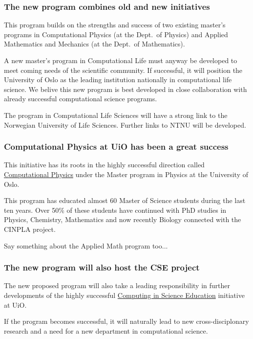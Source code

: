 \documentclass{beamer}
\begin{document}
\begin{frame}
\frametitle{The new program combines old and new initiatives}

\begin{block}{}

This program builds on the strengths and success of two existing master's
programs in Computational Physics (at the Dept.~of Physics) and
Applied Mathematics and Mechanics (at the Dept.~of Mathematics).

A new master's program in Computational Life must anyway be developed to
meet coming needs of the scientific community. If successful, it will
position the University of Oslo as the leading institution
nationally in computational life science. We belive this new program is
best developed in close collaboration with already successful
computational science programs.

The program in Computational Life Sciences will have a strong
link to the Norwegian University of Life Sciences. Further links to
NTNU will be developed.
\end{block}
\end{frame}

\begin{frame}
\frametitle{Computational Physics at UiO has been a great success}

\begin{block}{}

This initiative has its roots in the highly successful direction called \href{{http://www.uio.no/english/studies/programmes/physics-master/programme-options/computational/index.html}}{Computational Physics}
under the Master program in Physics at the University of Oslo.

This program has educated almost 60 Master of Science students during
the last ten years.  Over 50\% of these students have continued with
PhD studies in Physics, Chemistry, Mathematics and now recently
Biology connected with the CINPLA project.

Say something about the Applied Math program too...
\end{block}
\end{frame}

\begin{frame}
\frametitle{The new program will also host the CSE project}

\begin{block}{}

The new proposed program will also take a leading responsibility in further
developments of the highly successful \href{{http://www.mn.uio.no/english/about/collaboration/cse/}}{Computing in Science Education} initiative at UiO.

If the program becomes successful, it will naturally lead to
new cross-disciplonary research and a need for a new department
in computational science.
\end{block}
\end{frame}
\end{document}
